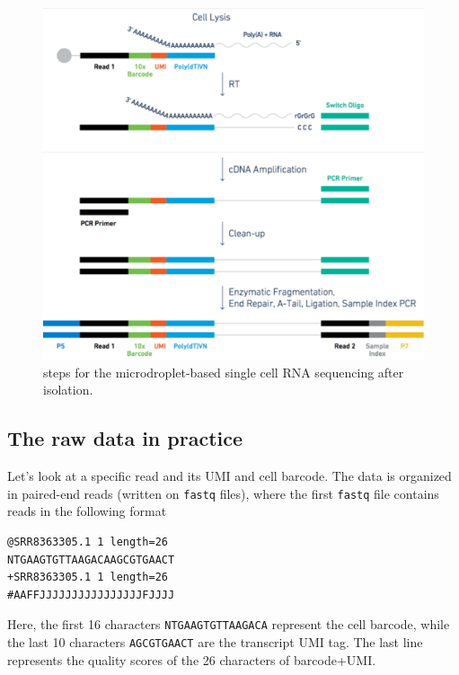 \documentclass[
  letterpaper,
  DIV=11,
  numbers=noendperiod]{scrartcl}
\begin{document}
\begin{figure}

{\centering \includegraphics[width=6.25in,height=\textheight]{images/10X.png}

}

\caption{\label{fig-steps}steps for the microdroplet-based single cell
RNA sequencing after isolation.}

\end{figure}

\hypertarget{the-raw-data-in-practice}{%
\subsection{The raw data in practice}\label{the-raw-data-in-practice}}

Let's look at a specific read and its UMI and cell barcode. The data is
organized in paired-end reads (written on \texttt{fastq} files), where
the first \texttt{fastq} file contains reads in the following format

\begin{verbatim}
@SRR8363305.1 1 length=26
NTGAAGTGTTAAGACAAGCGTGAACT
+SRR8363305.1 1 length=26
#AAFFJJJJJJJJJJJJJJJJFJJJJ
\end{verbatim}

Here, the first 16 characters \texttt{NTGAAGTGTTAAGACA} represent the
cell barcode, while the last 10 characters \texttt{AGCGTGAACT} are the
transcript UMI tag. The last line represents the quality scores of the
26 characters of barcode+UMI.
\end{document}

